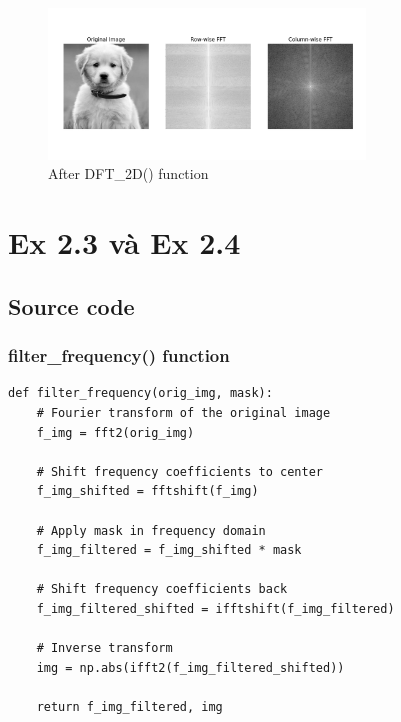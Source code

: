\documentclass{article}
\begin{document}
\begin{figure}[H]
    \centering
    \includegraphics[width=0.75\textwidth]{ex212_output}
    \caption{After DFT\_2D() function}
    \label{ex212_output}
\end{figure}


\section{Ex 2.3 và Ex 2.4}
\subsection{Source code}
\subsubsection{filter\_frequency() function}
\begin{lstlisting}[caption={Code of filter\_frequency() function}, label={filter\_frequency()}]
def filter_frequency(orig_img, mask):
    # Fourier transform of the original image
    f_img = fft2(orig_img)

    # Shift frequency coefficients to center
    f_img_shifted = fftshift(f_img)

    # Apply mask in frequency domain
    f_img_filtered = f_img_shifted * mask

    # Shift frequency coefficients back
    f_img_filtered_shifted = ifftshift(f_img_filtered)

    # Inverse transform
    img = np.abs(ifft2(f_img_filtered_shifted))

    return f_img_filtered, img
\end{lstlisting}
\end{document}
